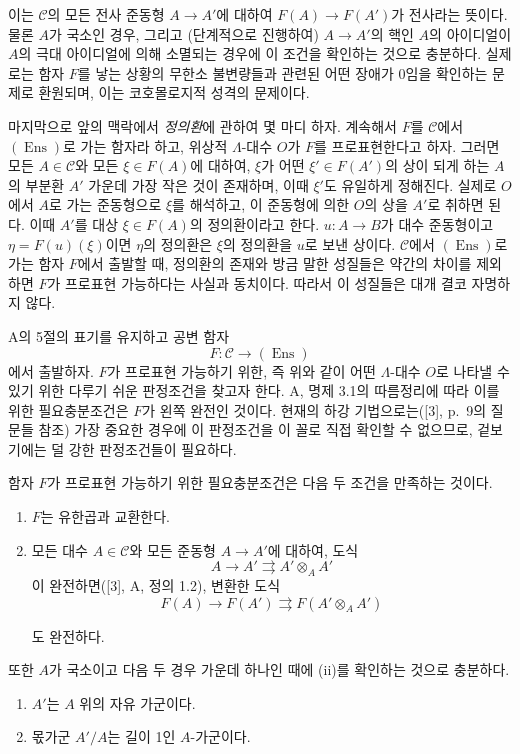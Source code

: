 이는 $\mathcal C$의 모든 전사 준동형 $A\longrightarrow A'$에 대하여
$F(A)\longrightarrow F(A')$가 전사라는 뜻이다. 물론 $A$가 국소인 경우,
그리고 (단계적으로 진행하여) $A\longrightarrow A'$의 핵인 $A$의
아이디얼이 $A$의 극대 아이디얼에 의해 소멸되는 경우에 이 조건을
확인하는 것으로 충분하다. 실제로는 함자 $F$를 낳는 상황의 무한소
불변량들과 관련된 어떤 장애가 0임을 확인하는 문제로 환원되며, 이는
코호몰로지적 성격의 문제이다.

마지막으로 앞의 맥락에서 \emph{정의환}에 관하여 몇 마디 하자. 계속해서
$F$를 $\mathcal C$에서 $(\operatorname{Ens})$로 가는 함자라 하고, 위상적
$\Lambda$-대수 $O$가 $F$를 프로표현한다고 하자. 그러면 모든
$A\in\mathcal C$와 모든 $\xi\in F(A)$에 대하여, $\xi$가 어떤
$\xi'\in F(A')$의 상이 되게 하는 $A$의 부분환 $A'$ 가운데 가장 작은 것이
존재하며, 이때 $\xi'$도 유일하게 정해진다. 실제로 $O$에서 $A$로 가는
준동형으로 $\xi$를 해석하고, 이 준동형에 의한 $O$의 상을 $A'$로 취하면
된다. 이때 $A'$를 대상 $\xi\in F(A)$의 정의환이라고 한다.
$u:A\longrightarrow B$가 대수 준동형이고 $\eta=F(u)(\xi)$이면 $\eta$의
정의환은 $\xi$의 정의환을 $u$로 보낸 상이다. $\mathcal C$에서
$(\operatorname{Ens})$로 가는 함자 $F$에서 출발할 때, 정의환의 존재와
방금 말한 성질들은 약간의 차이를 제외하면 $F$가 프로표현 가능하다는
사실과 동치이다. 따라서 이 성질들은 대개 결코 자명하지 않다.


A의 5절의 표기를 유지하고 공변 함자
\[
  F:\mathcal C\longrightarrow(\operatorname{Ens})
\]
에서 출발하자. $F$가 프로표현 가능하기 위한, 즉 위와 같이 어떤
$\Lambda$-대수 $O$로 나타낼 수 있기 위한 다루기 쉬운 판정조건을 찾고자
한다. A, 명제 3.1의 따름정리에 따라 이를 위한 필요충분조건은 $F$가 왼쪽
완전인 것이다. 현재의 하강 기법으로는([3], p.~9의 질문들 참조) 가장
중요한 경우에 이 판정조건을 이 꼴로 직접 확인할 수 없으므로, 겉보기에는
덜 강한 판정조건들이 필요하다.

 함자 $F$가 프로표현 가능하기 위한 필요충분조건은 다음
두 조건을 만족하는 것이다.
\begin{enumerate}
\item[(i)] $F$는 유한곱과 교환한다.
\item[(ii)] 모든 대수 $A\in\mathcal C$와 모든 준동형
$A\longrightarrow A'$에 대하여, 도식
\[
  A\longrightarrow A'\rightrightarrows A'\otimes_A A'
\]
이 완전하면([3], A, 정의 1.2), 변환한 도식
\[
  F(A)\longrightarrow F(A')\rightrightarrows F(A'\otimes_A A')
\]

도 완전하다.
\end{enumerate}
또한 $A$가 국소이고 다음 두 경우 가운데 하나인 때에 (ii)를 확인하는
것으로 충분하다.
\begin{enumerate}
\item[(a)] $A'$는 $A$ 위의 자유 가군이다.
\item[(b)] 몫가군 $A'/A$는 길이 1인 $A$-가군이다.
\end{enumerate}

